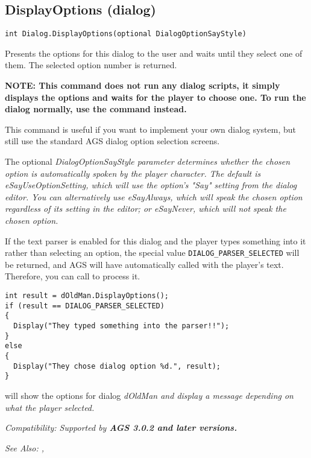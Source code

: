 \subsection{DisplayOptions (dialog)}\label{Dialog.DisplayOptions}%

\begin{verbatim}
int Dialog.DisplayOptions(optional DialogOptionSayStyle)
\end{verbatim}
Presents the options for this dialog to the user and waits until they select
one of them. The selected option number is returned.

\bf{NOTE:} This command does not run any dialog scripts, it simply displays
the options and waits for the player to choose one.  To run the dialog normally,
use the  command instead.

This command is useful if you want to implement your own dialog system, but still
use the standard AGS dialog option selection screens.

The optional \it{DialogOptionSayStyle} parameter determines whether the chosen option
is automatically spoken by the player character. The default is \it{eSayUseOptionSetting},
which will use the option's "Say" setting from the dialog editor. You can alternatively
use \it{eSayAlways}, which will speak the chosen option regardless of its setting
in the editor; or \it{eSayNever}, which will not speak the chosen option.

If the text parser is enabled for this dialog and the player types something into
it rather than selecting an option, the special value \verb$DIALOG_PARSER_SELECTED$
will be returned, and AGS will have automatically called 
with the player's text. Therefore, you can call 
to process it.

\begin{verbatim}
int result = dOldMan.DisplayOptions();
if (result == DIALOG_PARSER_SELECTED)
{
  Display("They typed something into the parser!!");
}
else
{
  Display("They chose dialog option %d.", result);
}
\end{verbatim}
will show the options for dialog \it{dOldMan} and display a message depending
on what the player selected.

\it{Compatibility:} Supported by \bf{AGS 3.0.2} and later versions.

\it{See Also:} ,


